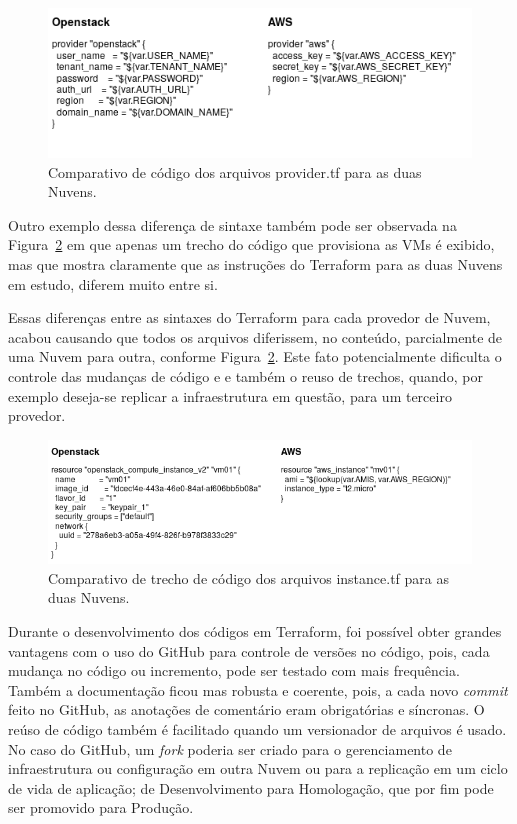 \documentclass[12pt]{article}
\begin{document}
	\begin{figure}[H]
		\centering
		\includegraphics[width=0.8\linewidth]{figuras/Figure3b.png}
		\caption{Comparativo de código dos arquivos provider.tf para as duas Nuvens.}
		\label{fig:figure3b}
	\end{figure}
	
	Outro exemplo dessa diferença de sintaxe também pode ser observada na Figura~\ref{fig:figure3} em que apenas um trecho do código que provisiona as VMs é exibido, mas que mostra claramente que as instruções do Terraform para as duas Nuvens em estudo, diferem muito entre si.
	
	Essas diferenças entre as sintaxes do Terraform para cada provedor de Nuvem, acabou causando que todos os arquivos diferissem, no conteúdo, parcialmente de uma Nuvem para outra, conforme Figura~\ref{fig:figure3}. Este fato potencialmente dificulta o controle das mudanças de código e e também o reuso de trechos, quando, por exemplo deseja-se replicar a infraestrutura em questão, para um terceiro provedor.
		
	\begin{figure}[ht]
		\centering
		\includegraphics[width=0.97\linewidth]{figuras/Figure3.png}
		\caption{Comparativo de trecho de código dos arquivos instance.tf para as duas Nuvens.}
		\label{fig:figure3}
	\end{figure}

	Durante o desenvolvimento dos códigos em Terraform, foi possível obter grandes vantagens com o uso do GitHub para controle de versões no código, pois, cada mudança no código ou incremento, pode ser testado com mais frequência. Também a documentação ficou mas robusta e coerente, pois, a cada novo \textit{commit} feito no GitHub, as anotações de comentário eram obrigatórias e síncronas. O reúso de código também é facilitado quando um versionador de arquivos é usado. No caso do GitHub, um \textit{fork} poderia ser criado para o gerenciamento de infraestrutura ou configuração em outra Nuvem ou para a replicação em um ciclo de vida de aplicação; de Desenvolvimento para Homologação, que por fim pode ser promovido para Produção.
	
\end{document}

